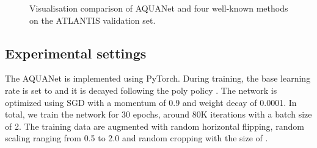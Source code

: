\documentclass{article}
\begin{document}
\begin{figure*}[h]
\caption{Visualisation comparison of AQUANet and four well-known methods on the ATLANTIS validation set.}
    \label{fig:56test}
\end{figure*}

\subsection{Experimental settings}
\label{exp_setting}

The AQUANet is implemented using PyTorch. 
During training, the base learning rate is set to  and it is decayed following the poly policy \cite{zhao2017pyramid}.
The network is optimized using SGD with a momentum of 0.9 and weight decay of 0.0001.
In total, we train the network for 30 epochs, around 80K iterations with a batch size of 2.
The training data are augmented with random horizontal flipping, random scaling ranging from 0.5 to 2.0 and random cropping with the size of .
\end{document}
